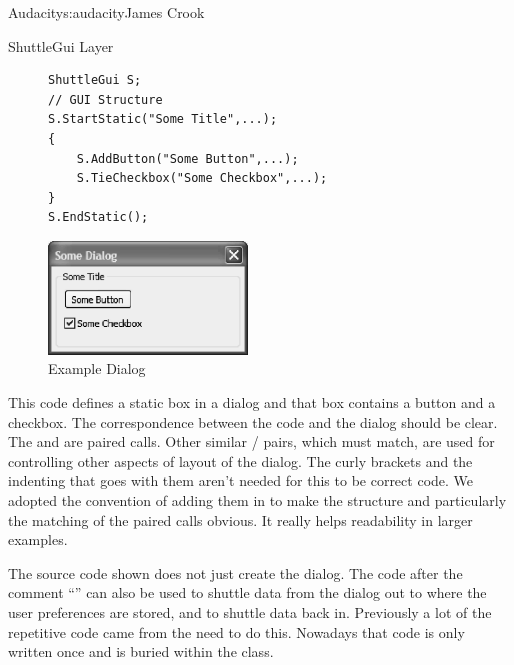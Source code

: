 \begin{aosachapter}{Audacity}{s:audacity}{James Crook}
\begin{aosasect1}{ShuttleGui Layer}
\begin{figure}[h!]
\begin{minipage}[b]{7cm}
\begin{verbatim}
ShuttleGui S;
// GUI Structure
S.StartStatic("Some Title",...);
{
    S.AddButton("Some Button",...);
    S.TieCheckbox("Some Checkbox",...);
}
S.EndStatic();
\end{verbatim}
\end{minipage}
\begin{minipage}[b]{7cm}
\centering
\includegraphics[width={150pt}]{../images/audacity/SomeDialog.eps}
\end{minipage}
\caption{Example Dialog}
\label{fig.aud.2}
\end{figure}

This code defines a static box in a dialog and that box contains a
button and a checkbox.  The correspondence between the code and the
dialog should be clear.  The  and 
are paired calls.  Other similar
/ pairs, which must match, are
used for controlling other aspects of layout of the dialog.  The curly
brackets and the indenting that goes with them aren't needed for this
to be correct code.  We adopted the convention of adding them in to
make the structure and particularly the matching of the paired calls
obvious.  It really helps readability in larger examples.

The source code shown does not just create the dialog.  The code after
the comment ``'' can also be used to shuttle
data from the dialog out to where the user preferences are stored, and
to shuttle data back in.  Previously a lot of the repetitive code came
from the need to do this.  Nowadays that code is only written once and
is buried within the  class.


\end{aosasect1}
\end{aosachapter}
